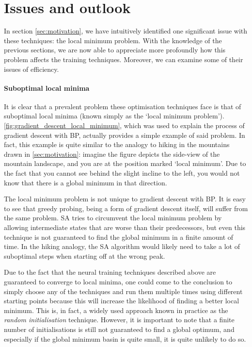 \section{Issues and outlook}
\label{sec:neural_training_issues}
In section \ref{sec:motivation}, we have intuitively identified one significant issue with these techniques: the local minimum problem.
With the knowledge of the previous sections, we are now able to appreciate more profoundly how this problem affects the training techniques.
Moreover, we can examine some of their issues of efficiency.

\paragraph{Suboptimal local minima}
It is clear that a prevalent problem these optimisation techniques face is that of suboptimal local minima (known simply as the `local minimum problem').
\ref{fig:gradient_descent_local_minimum}, which was used to explain the process of gradient descent with BP, actually provides a simple example of said problem.
In fact, this example is quite similar to the analogy to hiking in the mountains drawn in \ref{sec:motivation}: imagine the figure depicts the side-view of the mountain landscape, and you are at the position marked `local minimum'.
Due to the fact that you cannot see behind the slight incline to the left, you would not know that there is a global minimum in that direction.

The local minimum problem is not unique to gradient descent with BP.
It is easy to see that greedy probing, being a form of gradient descent itself, will suffer from the same problem.
SA tries to circumvent the local minimum problem by allowing intermediate states that are worse than their predecessors, but even this technique is not guaranteed to find the global minimum in a finite amount of time.
In the hiking analogy, the SA algorithm would likely need to take a lot of suboptimal steps when starting off at the wrong peak.

Due to the fact that the neural training techniques described above are guaranteed to converge to local minima, one could come to the conclusion to simply choose any of the techniques and run them multiple times using different starting points because this will increase the likelihood of finding a better local minimum.
This is, in fact, a widely used approach known in practice as the \textit{random initialisation} technique.
However, it is important to note that a finite number of initialisations is still not guaranteed to find a global optimum, and especially if the global minimum basin is quite small, it is quite unlikely to do so.


